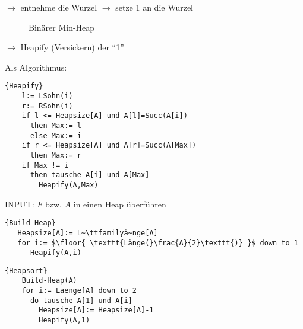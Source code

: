 \documentclass[ngerman,draft,parskip=half*,twoside]{scrreprt}
\theoremstyle{break}
\theoremstyle{nonumberbreak}
\DeclarePairedDelimiter{\floor}{\lfloor}{\rfloor}
\begin{document}
$\rightarrow$ entnehme die Wurzel \hspace{5cm}
$\rightarrow$ setze 1 an die Wurzel

\begin{figure}[H]
	\centering\hspace{6mm}\hspace{6mm}
	\caption{Binärer Min-Heap}
	\label{101103f}
\end{figure}
$\rightarrow$ Heapify (Versickern) der "`1"' 

Als Algorithmus:
  \begin{Algorithmus}[ht]
  \begin{lstlisting}[frame=tlrb, mathescape=true, title=\textsc{Heapify\textnormal{(A)}}, gobble=4]{Heapify}
    l:= LSohn(i)
    r:= RSohn(i)
    if l <= Heapsize[A] und A[l]=Succ(A[i])
      then Max:= l
      else Max:= i
    if r <= Heapsize[A] und A[r]=Succ(A[Max])
      then Max:= r
    if Max != i
      then tausche A[i] und A[Max]
        Heapify(A,Max) 
    \end{lstlisting}
  \end{Algorithmus}

INPUT: $F$ bzw. $A$ in einen Heap überführen
\begin{Algorithmus}[ht]
\begin{lstlisting}[frame=tlrb, mathescape=true, title=\textsc{Build-Heap\textnormal{(A)}}, gobble=2]{Build-Heap}  
   Heapsize[A]:= L~\ttfamilyä~nge[A]
   for i:= $\floor{ \texttt{Länge(}\frac{A}{2}\texttt{)} }$ down to 1
      Heapify(A,i)
    \end{lstlisting}
  \end{Algorithmus}

  \begin{Algorithmus}[ht]
\begin{lstlisting}[frame=tlrb, mathescape=true, title=\textsc{Heapsort\textnormal{(A)}}, gobble=4]{Heapsort}
    Build-Heap(A)
    for i:= Laenge[A] down to 2
      do tausche A[1] und A[i]
        Heapsize[A]:= Heapsize[A]-1
        Heapify(A,1)
    \end{lstlisting}
  \end{Algorithmus}
  
\end{document}
